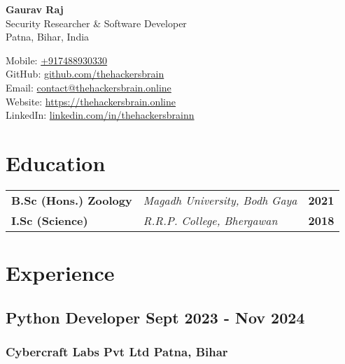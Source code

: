 \documentclass[11pt]{article} %
\begin{document}
\begin{center}
	\begin{minipage}{0.4\textwidth}
		{\Huge\bfseries
			Gaurav Raj %
		} \\ \medskip
		Security Researcher \& Software Developer \\ %
    Patna, Bihar, India
	\end{minipage} \hfill
	\begin{minipage}{0.5\textwidth}
		\raggedleft
		Mobile: \href{tel:+917488930330}{+917488930330} \\
		GitHub: \href{https://github.com/thehackersbrain}{github.com/thehackersbrain} \\
		Email: \href{mailto:contact@thehackersbrain.online}{contact@thehackersbrain.online} \\
		Website: \href{https://thehackersbrain.online}{https://thehackersbrain.online} \\
		LinkedIn: \href{https://www.linkedin.com/in/thehackersbrainn}{linkedin.com/in/thehackersbrainn}
	\end{minipage}
\end{center}


\section{Education}

\begin{tabular}{@{} p{} p{} r @{}}
    \textbf{B.Sc (Hons.) Zoology} & \textit{Magadh University, Bodh Gaya} & \textbf{2021} \\
    \textbf{I.Sc (Science)} & \textit{R.R.P. College, Bhergawan} & \textbf{2018} \\
\end{tabular}


\section{Experience}
\subsection{Python Developer \hfill Sept 2023 - Nov 2024}
\subsubsection{Cybercraft Labs Pvt Ltd \hfill Patna, Bihar}
\vspace{8pt}
\end{document}

